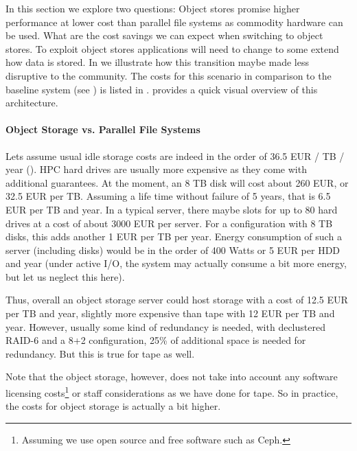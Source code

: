 \documentclass{../../template/esiwace-report}
\begin{document}
In this section we explore two questions:
Object stores promise higher performance at lower cost than parallel file systems as commodity hardware can be used. What are the cost savings we can expect when switching to object stores.
To exploit object stores applications will need to change to some extend how data is stored. In 
we illustrate how this transition maybe made less disruptive to the community.
The costs for this scenario in comparison to the baseline system (see ) is listed in .
 provides a quick visual overview of this architecture.



\paragraph{Object Storage vs. Parallel File Systems}

Lets assume usual idle storage costs are indeed in the order of 36.5 EUR / TB / year ().
HPC hard drives are usually more expensive as they come with additional guarantees.
At the moment, an 8 TB disk will cost about 260 EUR, or 32.5 EUR per TB.
Assuming a life time without failure of 5 years, that is 6.5 EUR per TB and year.
In a typical server, there maybe slots for up to 80 hard drives at a cost of about 3000 EUR per server.
For a configuration with 8 TB disks, this adds another 1 EUR per TB per year.
Energy consumption of such a server (including disks) would be in the order of 400 Watts or 5 EUR per HDD and year (under active I/O, the system may actually consume a bit more energy, but let us neglect this here).

Thus, overall an object storage server could host storage with a cost of 12.5 EUR per TB and year, slightly more expensive than tape with 12 EUR per TB and year.
However, usually some kind of redundancy is needed, with declustered RAID-6 and a 8+2 configuration, 25\% of additional space is needed for redundancy. 
But this is true for tape as well.

Note that the object storage, however, does not take into account any software licensing costs\footnote{Assuming we use open source and free software such as Ceph.} or staff considerations as we have done for tape.
So in practice, the costs for object storage is actually a bit higher.
\end{document}
